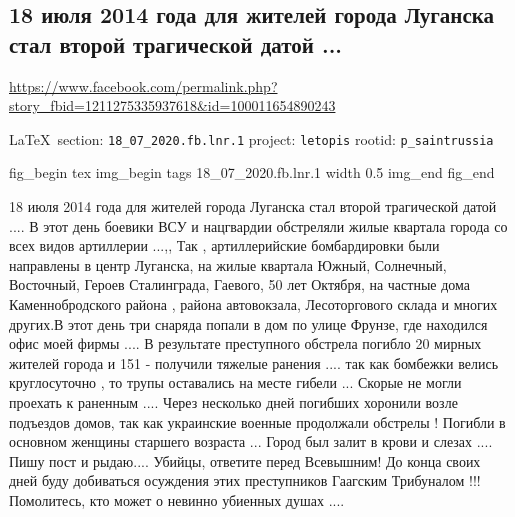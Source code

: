  
 
  
\subsection{18 июля 2014 года для жителей города Луганска стал второй трагической датой ...}
\url{https://www.facebook.com/permalink.php?story_fbid=1211275335937618&id=100011654890243}

\vspace{0.5cm}
{\small\LaTeX~section: \verb|18_07_2020.fb.lnr.1| project: \verb|letopis| rootid: \verb|p_saintrussia|}
\vspace{0.5cm}

\ifcmt
fig_begin 
	tex \centering
  img_begin 
    tags 18_07_2020.fb.lnr.1
    width 0.5
  img_end
fig_end
\fi
  
18 июля 2014 года для жителей города Луганска стал второй трагической датой
.... В этот день боевики ВСУ и нацгвардии обстреляли жилые квартала города со
всех видов артиллерии ...,, Так , артиллерийские бомбардировки были направлены
в центр Луганска, на жилые квартала Южный, Солнечный, Восточный, Героев
Сталинграда, Гаевого, 50 лет Октября, на частные дома Каменнобродского района ,
района автовокзала, Лесоторгового склада и многих других.В этот день три
снаряда попали в дом по улице Фрунзе, где находился офис моей фирмы .... В
результате преступного обстрела погибло 20 мирных жителей города и 151 -
получили тяжелые ранения .... так как бомбежки велись круглосуточно , то трупы
оставались на месте гибели ... Скорые не могли проехать к раненным .... Через
несколько дней погибших хоронили возле подъездов домов, так как украинские
военные продолжали обстрелы ! Погибли в основном женщины старшего возраста ...
Город был залит в крови и слезах .... Пишу пост и рыдаю.... Убийцы, ответите
перед Всевышним! До конца своих дней буду добиваться осуждения этих
преступников Гаагским Трибуналом !!! Помолитесь, кто может о невинно убиенных
душах ....
  
